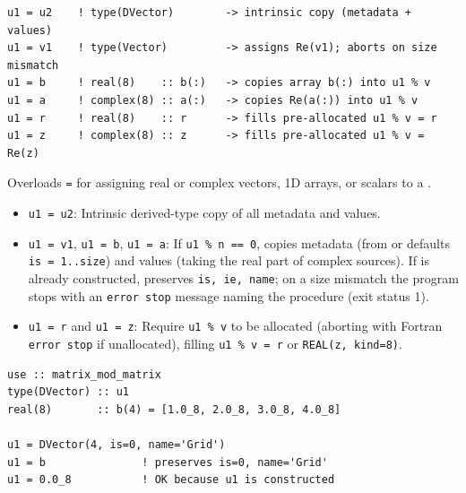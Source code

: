 \lstset{language=[95]Fortran}
\begin{lstlisting}
u1 = u2    ! type(DVector)        -> intrinsic copy (metadata + values)
u1 = v1    ! type(Vector)         -> assigns Re(v1); aborts on size mismatch
u1 = b     ! real(8)    :: b(:)   -> copies array b(:) into u1 % v
u1 = a     ! complex(8) :: a(:)   -> copies Re(a(:)) into u1 % v
u1 = r     ! real(8)    :: r      -> fills pre-allocated u1 % v = r
u1 = z     ! complex(8) :: z      -> fills pre-allocated u1 % v = Re(z)
\end{lstlisting}

Overloads \texttt{=} for assigning real or complex vectors, 1D arrays, or scalars to a .

\begin{itemize}
  \item \texttt{u1 = u2}: Intrinsic derived-type copy of all metadata and values.
  \item \texttt{u1 = v1}, \texttt{u1 = b}, \texttt{u1 = a}: If \texttt{u1 \% n == 0}, copies metadata (from  or defaults \texttt{is = 1..size}) and values (taking the real part of complex sources). If  is already constructed, preserves \texttt{is, ie, name}; on a size mismatch the program stops with an \texttt{error stop} message naming the procedure (exit status 1).
  \item \texttt{u1 = r} and \texttt{u1 = z}: Require \texttt{u1 \% v} to be allocated (aborting with Fortran \texttt{error stop} if unallocated), filling \texttt{u1 \% v = r} or \texttt{REAL(z, kind=8)}.
\end{itemize}

\begin{description}[leftmargin=2.2cm, style=nextline]
\end{description}

\lstset{language=[95]Fortran}
\begin{lstlisting}
use :: matrix_mod_matrix
type(DVector) :: u1
real(8)       :: b(4) = [1.0_8, 2.0_8, 3.0_8, 4.0_8]

u1 = DVector(4, is=0, name='Grid')
u1 = b               ! preserves is=0, name='Grid'
u1 = 0.0_8           ! OK because u1 is constructed
\end{lstlisting}

